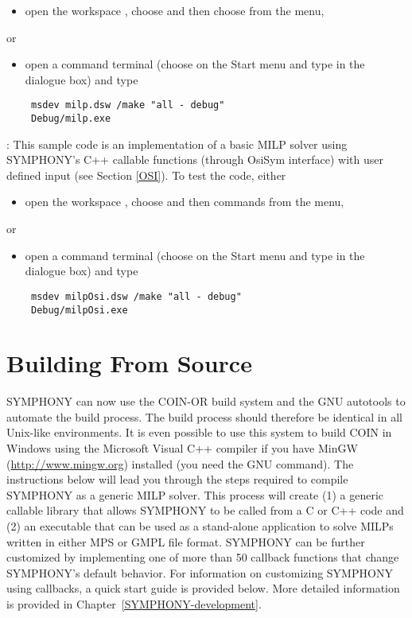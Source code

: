 \begin{itemize}
\begin{itemize}
\item open the workspace , choose 
and then choose  from the  menu, 
\end{itemize}
or
\begin{itemize}
\item open a command terminal (choose  on the Start menu and type
 in the dialogue box) and type 
{\color{Brown}
\begin{verbatim}
 msdev milp.dsw /make "all - debug"
 Debug/milp.exe
 \end{verbatim}
}
\end{itemize}
: This sample code is an implementation of a basic MILP 
solver using SYMPHONY's C++ callable functions (through OsiSym interface)
with user defined input (see Section \ref{OSI}). To test the code, either 
\begin{itemize}
\item open the workspace , 
choose  and then 
 commands from the  menu, 
\end{itemize}
or
\begin{itemize}
\item open a command terminal (choose  on the Start menu and type
 in the dialogue box) and type 
{\color{Brown}
\begin{verbatim}
 msdev milpOsi.dsw /make "all - debug"
 Debug/milpOsi.exe
 \end{verbatim}
}
\end{itemize}
\end{itemize}



\section{Building From Source} 
\label{building_from_source}

SYMPHONY can now use the COIN-OR build system and the GNU autotools to
automate the build process. The build process should therefore be identical in
all Unix-like environments. It is even possible to use this system to build
COIN in Windows using the Microsoft Visual C++ compiler if you have MinGW
(\url{http://www.mingw.org}) installed (you need the GNU  command).
The instructions below will lead you through the steps required to compile
SYMPHONY as a generic MILP solver. This process will create (1) a generic
callable library that allows SYMPHONY to be called from a C or C++ code and
(2) an executable that can be used as a stand-alone application to solve MILPs
written in either MPS or GMPL file format. SYMPHONY can be further customized
by implementing one of more than 50 callback functions that change SYMPHONY's
default behavior. For information on customizing SYMPHONY using callbacks, a
quick start guide is provided below. More detailed information is provided in
Chapter~\ref{SYMPHONY-development}.

